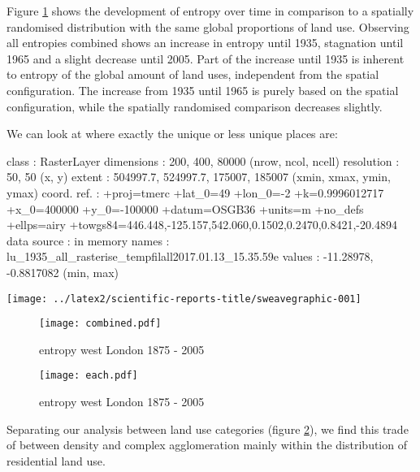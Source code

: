 \documentclass[fleqn,10pt]{wlscirep}
\begin{document}

Figure \ref{fig:real_combined}  shows the development of entropy over time in comparison to a spatially randomised distribution with the same global proportions of land use. 
Observing all entropies combined shows an increase in entropy until 1935, stagnation until 1965 and a slight decrease until 2005. Part of the increase until 1935 is inherent to entropy of the global amount of land uses, independent from the spatial configuration. The increase from 1935 until 1965 is purely based on the spatial configuration, while the spatially randomised comparison decreases slightly.

We can look at where exactly the unique or less unique places are:

\begin{Schunk}
\begin{Soutput}
class       : RasterLayer 
dimensions  : 200, 400, 80000  (nrow, ncol, ncell)
resolution  : 50, 50  (x, y)
extent      : 504997.7, 524997.7, 175007, 185007  (xmin, xmax, ymin, ymax)
coord. ref. : +proj=tmerc +lat_0=49 +lon_0=-2 +k=0.9996012717 +x_0=400000 +y_0=-100000 +datum=OSGB36 +units=m +no_defs +ellps=airy +towgs84=446.448,-125.157,542.060,0.1502,0.2470,0.8421,-20.4894 
data source : in memory
names       : lu_1935_all_rasterise_tempfilall2017.01.13_15.35.59e 
values      : -11.28978, -0.8817082  (min, max)
\end{Soutput}
\end{Schunk}
\texttt{[image: ../latex2/scientific-reports-title/sweavegraphic-001]}


\begin{figure}[h]

   \centering
   \texttt{[image: combined.pdf]}
   \caption{entropy west London 1875 - 2005}
   \label{fig:real_combined}
\end{figure}



\begin{figure}[h]

   \centering
   \texttt{[image: each.pdf]}
   \caption{entropy west London 1875 - 2005}
   \label{fig:real_individually}
\end{figure}

Separating our analysis between land use categories (figure \ref{fig:real_individually}), we find this trade of between density and complex agglomeration mainly within the distribution of residential land use. 
\end{document}
